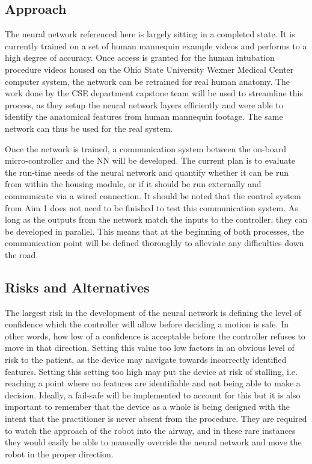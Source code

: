 \subsection{Approach}

The neural network referenced here is largely sitting in a completed state. It is currently trained on a set of human mannequin example videos and performs to a high degree of accuracy. Once access is granted for the human intubation procedure videos housed on the Ohio State University Wexner Medical Center computer system, the network can be retrained for real human anatomy. The work done by the CSE department capstone team will be used to streamline this process, as they setup the neural network layers efficiently and were able to identify the anatomical features from human mannequin footage. The same network can thus be used for the real system.

Once the network is trained, a communication system between the on-board micro-controller and the NN will be developed. The current plan is to evaluate the run-time needs of the neural network and quantify whether it can be run from within the housing module, or if it should be run externally and communicate via a wired connection. It should be noted that the control system from Aim 1 does not need to be finished to test this communication system. As long as the outputs from the network match the inputs to the controller, they can be developed in parallel. This means that at the beginning of both processes, the communication point will be defined thoroughly to alleviate any difficulties down the road.

\subsection{Risks and Alternatives}

The largest risk in the development of the neural network is defining the level of confidence which the controller will allow before deciding a motion is safe. In other words, how low of a confidence is acceptable before the controller refuses to move in that direction. Setting this value too low factors in an obvious level of risk to the patient, as the device may navigate towards incorrectly identified features. Setting this setting too high may put the device at risk of stalling, i.e. reaching a point where no features are identifiable and not being able to make a decision. Ideally, a fail-safe will be implemented to account for this but it is also important to remember that the device as a whole is being designed with the intent that the practitioner is never absent from the procedure. They are required to watch the approach of the robot into the airway, and in these rare instances they would easily be able to manually override the neural network and move the robot in the proper direction.